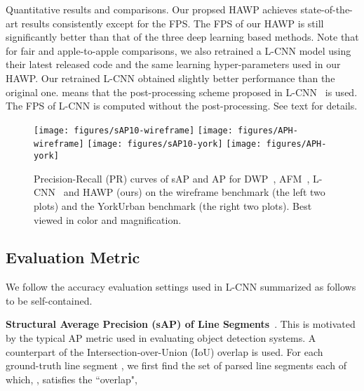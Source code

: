 \documentclass[10pt,twocolumn,letterpaper]{article}
\begin{document}
\begin{table*}[t]
\caption{Quantitative results and comparisons. Our propsed HAWP achieves state-of-the-art results consistently except for the FPS. The FPS of our HAWP is still significantly better than that of the three deep learning based methods. Note that for fair and apple-to-apple comparisons, we also retrained a L-CNN model using their latest released code and the same learning hyper-parameters used in our HAWP. Our retrained L-CNN obtained slightly better performance than the original one.  means that the post-processing scheme proposed in L-CNN~\cite{ZhouQM19} is used. {The FPS of L-CNN is computed without the post-processing.} See text for details.}
    \vspace{-3mm}
    \label{tab:summary-metric}
\end{table*}

\begin{figure*} [ht]
    \centering
    \texttt{[image: figures/sAP10-wireframe]} 
     \texttt{[image: figures/APH-wireframe]}
      \texttt{[image: figures/sAP10-york]}
      \texttt{[image: figures/APH-york]}
    \caption{Precision-Recall (PR) curves of sAP and AP for DWP~\cite{Huang2018a}, AFM~\cite{afm}, L-CNN~\cite{ZhouQM19} and HAWP (ours) on the wireframe benchmark (the left two plots) and the YorkUrban benchmark (the right two plots). Best viewed in color and magnification.}
    \vspace{-3mm}
    \label{fig:pr-curves}
\end{figure*}

\subsection{Evaluation Metric}\label{sec:metric}
\vspace{-2mm} 
We follow the accuracy evaluation settings used in L-CNN  summarized as follows to be self-contained. 

\textbf{{Structural Average Precision (sAP)} of Line Segments}~\cite{ZhouQM19}. This is motivated by the typical AP metric used in evaluating object detection systems. A counterpart of the Intersection-over-Union (IoU) overlap is used. For each ground-truth line segment , we first find the set of parsed line segments each of which, , satisfies the ``overlap", 
\end{document}
